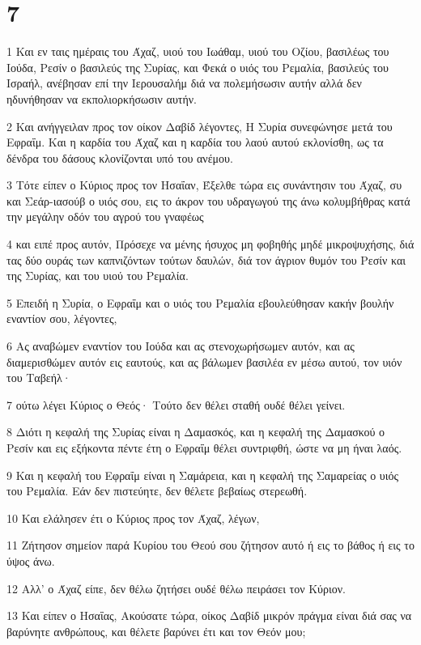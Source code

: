 \chapter{7}

\par 1 Και εν ταις ημέραις του Άχαζ, υιού του Ιωάθαμ, υιού του Οζίου, βασιλέως του Ιούδα, Ρεσίν ο βασιλεύς της Συρίας, και Φεκά ο υιός του Ρεμαλία, βασιλεύς του Ισραήλ, ανέβησαν επί την Ιερουσαλήμ διά να πολεμήσωσιν αυτήν αλλά δεν ηδυνήθησαν να εκπολιορκήσωσιν αυτήν.
\par 2 Και ανήγγειλαν προς τον οίκον Δαβίδ λέγοντες, Η Συρία συνεφώνησε μετά του Εφραΐμ. Και η καρδία του Άχαζ και η καρδία του λαού αυτού εκλονίσθη, ως τα δένδρα του δάσους κλονίζονται υπό του ανέμου.
\par 3 Τότε είπεν ο Κύριος προς τον Ησαΐαν, Έξελθε τώρα εις συνάντησιν του Άχαζ, συ και Σεάρ-ιασούβ ο υιός σου, εις το άκρον του υδραγωγού της άνω κολυμβήθρας κατά την μεγάλην οδόν του αγρού του γναφέως
\par 4 και ειπέ προς αυτόν, Πρόσεχε να μένης ήσυχος μη φοβηθής μηδέ μικροψυχήσης, διά τας δύο ουράς των καπνιζόντων τούτων δαυλών, διά τον άγριον θυμόν του Ρεσίν και της Συρίας, και του υιού του Ρεμαλία.
\par 5 Επειδή η Συρία, ο Εφραΐμ και ο υιός του Ρεμαλία εβουλεύθησαν κακήν βουλήν εναντίον σου, λέγοντες,
\par 6 Ας αναβώμεν εναντίον του Ιούδα και ας στενοχωρήσωμεν αυτόν, και ας διαμερισθώμεν αυτόν εις εαυτούς, και ας βάλωμεν βασιλέα εν μέσω αυτού, τον υιόν του Ταβεήλ·
\par 7 ούτω λέγει Κύριος ο Θεός· Τούτο δεν θέλει σταθή ουδέ θέλει γείνει.
\par 8 Διότι η κεφαλή της Συρίας είναι η Δαμασκός, και η κεφαλή της Δαμασκού ο Ρεσίν και εις εξήκοντα πέντε έτη ο Εφραΐμ θέλει συντριφθή, ώστε να μη ήναι λαός.
\par 9 Και η κεφαλή του Εφραΐμ είναι η Σαμάρεια, και η κεφαλή της Σαμαρείας ο υιός του Ρεμαλία. Εάν δεν πιστεύητε, δεν θέλετε βεβαίως στερεωθή.
\par 10 Και ελάλησεν έτι ο Κύριος προς τον Άχαζ, λέγων,
\par 11 Ζήτησον σημείον παρά Κυρίου του Θεού σου ζήτησον αυτό ή εις το βάθος ή εις το ύψος άνω.
\par 12 Αλλ' ο Άχαζ είπε, δεν θέλω ζητήσει ουδέ θέλω πειράσει τον Κύριον.
\par 13 Και είπεν ο Ησαΐας, Ακούσατε τώρα, οίκος Δαβίδ μικρόν πράγμα είναι διά σας να βαρύνητε ανθρώπους, και θέλετε βαρύνει έτι και τον Θεόν μου;
